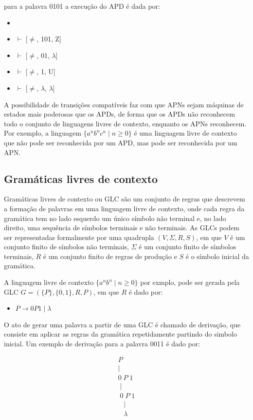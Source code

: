 para a palavra 0101 a execução do APD é dada por:

\begin{itemize}
    \item[] [=, 0101, $\lambda$] 
    \item[] $\vdash$ [$\neq$, 101, Z] 
    \item[] $\vdash$ [$\neq$, 01, $\lambda$] 
    \item[] $\vdash$ [$\neq$, 1, U]
    \item[] $\vdash$ [$\neq$, $\lambda$, $\lambda$]
\end{itemize}

A possibilidade de transições compatíveis faz com que APNs sejam máquinas de estados mais poderosas que os APDs, de forma que os APDs não reconhecem todo o conjunto de linguagens livres de contexto, enquanto os APNs reconhecem. Por exemplo, a linguagem $\{a^n b^n c^n \mid n \geq 0\}$ é uma linguagem livre de contexto que não pode ser reconhecida por um APD, mas pode ser reconhecida por um APN.

\subsection{Gramáticas livres de contexto}

Gramáticas livres de contexto ou GLC são um conjunto de regras que descrevem a formação de palavras em uma linguagem livre de contexto, onde cada regra da gramática tem no lado esquerdo um único símbolo não terminal e, no lado direito, uma sequência de símbolos terminais e não terminais. As GLCs podem ser representadas formalmente por uma quadrupla $(V, \Sigma, R, S)$, em que $V$ é um conjunto finito de símbolos não terminais, $\Sigma$ é um conjunto finito de símbolos terminais, $R$ é um conjunto finito de regras de produção e $S$ é o símbolo inicial da gramática.

A linguagem livre de contexto $\{a^n b^n \mid n \geq 0\}$ por exmplo, pode ser gerada pela GLC $ G = (\{P\}, \{0, 1\}, R, P)$, em que $R$ é dado por:
\begin{itemize}
    \item[] $P \to 0P1 \mid \lambda$
\end{itemize}

O ato de gerar uma palavra a partir de uma GLC é chamado de derivação, que consiste em aplicar as regras da gramática repetidamente partindo do simbolo inicial. Um exemplo de derivação para a palavra 0011 é dado por:

\[
\begin{array}{c}
P \\
| \\
0 \; P \; 1 \\
\; | \\
\; 0 \; P \; 1 \\
\;\;\; | \\
\;\;\; \lambda
\end{array}
\]

